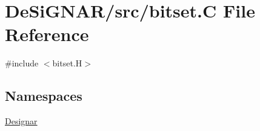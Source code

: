 \hypertarget{bitset_8_c}{}\section{De\+Si\+G\+N\+A\+R/src/bitset.C File Reference}
\label{bitset_8_c}
{\ttfamily \#include $<$bitset.\+H$>$}\newline
\subsection*{Namespaces}
\begin{DoxyCompactItemize}
\item 
 \hyperlink{namespace_designar}{Designar}
\end{DoxyCompactItemize}
